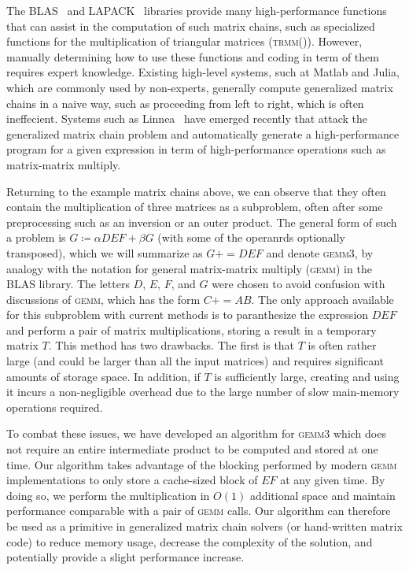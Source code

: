 \documentclass[12pt]{article}
\newcommand*{\pluseq}{\mathrel{{+}{=}}}
\newcommand*{\gemmt}{{\textsc{gemm3}}}
\newcommand*{\gemm}{{\textsc{gemm}}}
\newcommand*{\mycite}[1]{~\cite{#1}}
\begin{document}
The BLAS\mycite{blas_standard} and LAPACK\mycite{lapack_ug} libraries provide many high-performance functions that can assist in the computation of such matrix chains, such as specialized functions for the multiplication of triangular matrices (\textsc{trmm}()).
However, manually determining how to use these functions and coding in term of them requires expert knowledge.
Existing high-level systems, such at Matlab and Julia, which are commonly used by non-experts, generally compute generalized matrix chains in a naive way, such as proceeding from left to right, which is often ineffecient.
Systems such as Linnea\mycite{Barthels2017} have emerged recently that attack the generalized matrix chain problem and automatically generate a high-performance program for a given expression in term of high-performance operations such as matrix-matrix multiply.

Returning to the example matrix chains above, we can observe that they often contain the multiplication of three matrices as a subproblem, often after some preprocessing such as an inversion or an outer product.
The general form of such a problem is $G \coloneqq \alpha DEF + \beta G$ (with some of the operanrds optionally transposed), which we will summarize as $G \pluseq DEF$ and denote \gemmt{}, by analogy with the notation for general matrix-matrix multiply (\gemm{}) in the BLAS library.
The letters $D$, $E$, $F$, and $G$ were chosen to avoid confusion with discussions of \gemm{}, which has the form $C \pluseq AB$.
The only approach available for this subproblem with current methods is to paranthesize the expression $DEF$ and perform a pair of matrix multiplications, storing a result in a temporary matrix $T$.
This method has two drawbacks.
The first is that $T$ is often rather large (and could be larger than all the input matrices) and requires significant amounts of storage space.
In addition, if $T$ is sufficiently large, creating and using it incurs a non-negligible overhead due to the large number of slow main-memory operations required.

To combat these issues, we have developed an algorithm for \gemmt{} which does not require an entire intermediate product to be computed and stored at one time.
Our algorithm takes advantage of the blocking performed by modern \gemm{} implementations to only store a cache-sized block of $EF$ at any given time.
By doing so, we perform the multiplication in $O(1)$ additional space and maintain performance comparable with a pair of \gemm{} calls.
Our algorithm can therefore be used as a primitive in generalized matrix chain solvers (or hand-written matrix code) to reduce memory usage, decrease the complexity of the solution, and potentially provide a slight performance increase.
\end{document}
